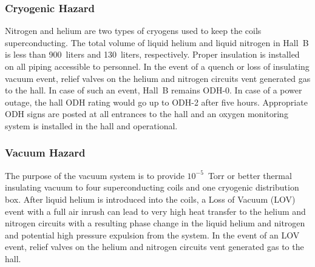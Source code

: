 \subsubsection{Cryogenic Hazard}

Nitrogen and helium are two types of cryogens used to keep the coils superconducting. The 
total volume of liquid helium and liquid nitrogen in Hall~B is less than 900~liters and 
130~liters, respectively. Proper insulation is installed on all piping accessible to 
personnel. In the event of a quench or loss of insulating vacuum event, relief valves on 
the helium and nitrogen circuits vent generated gas to the hall. In case of such an event, 
Hall~B remains ODH-0. In case of a power outage, the hall ODH rating would go up to ODH-2 
after five hours. Appropriate ODH signs are posted at all entrances to the hall and an 
oxygen monitoring system is installed in the hall and operational.

\subsubsection{Vacuum Hazard}

The purpose of the vacuum system is to provide $10^{-5}$~Torr or better thermal insulating 
vacuum to four superconducting coils and one cryogenic distribution box. After liquid helium 
is introduced into the coils, a Loss of Vacuum (LOV) event with a full air inrush can lead to
very high heat transfer to the helium and nitrogen circuits with a resulting phase change in 
the liquid helium and nitrogen and potential high pressure expulsion from the system. In the 
event of an LOV event, relief valves on the helium and nitrogen circuits vent generated
gas to the hall.

